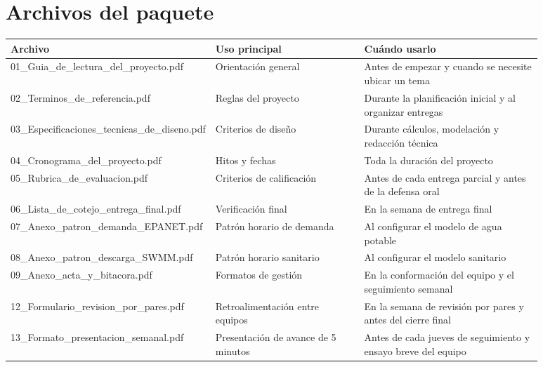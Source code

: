 \documentclass[11pt]{article}
\begin{document}
\section{Archivos del paquete}
\begin{center}
\begin{tabular}{p{0.18\linewidth} p{0.31\linewidth} p{0.39\linewidth}}
\toprule
\textbf{Archivo} & \textbf{Uso principal} & \textbf{Cu\'ando usarlo} \\
\midrule
01\_Guia\_de\_lectura\_del\_proyecto.pdf & Orientaci\'on general & Antes de empezar y cuando se necesite ubicar un tema \\
02\_Terminos\_de\_referencia.pdf & Reglas del proyecto & Durante la planificaci\'on inicial y al organizar entregas \\
03\_Especificaciones\_tecnicas\_de\_diseno.pdf & Criterios de dise\~no & Durante c\'alculos, modelaci\'on y redacci\'on t\'ecnica \\
04\_Cronograma\_del\_proyecto.pdf & Hitos y fechas & Toda la duraci\'on del proyecto \\
05\_Rubrica\_de\_evaluacion.pdf & Criterios de calificaci\'on & Antes de cada entrega parcial y antes de la defensa oral \\
06\_Lista\_de\_cotejo\_entrega\_final.pdf & Verificaci\'on final & En la semana de entrega final \\
07\_Anexo\_patron\_demanda\_EPANET.pdf & Patr\'on horario de demanda & Al configurar el modelo de agua potable \\
08\_Anexo\_patron\_descarga\_SWMM.pdf & Patr\'on horario sanitario & Al configurar el modelo sanitario \\
09\_Anexo\_acta\_y\_bitacora.pdf & Formatos de gesti\'on & En la conformaci\'on del equipo y el seguimiento semanal \\
12\_Formulario\_revision\_por\_pares.pdf & Retroalimentaci\'on entre equipos & En la semana de revisi\'on por pares y antes del cierre final \\
13\_Formato\_presentacion\_semanal.pdf & Presentaci\'on de avance de 5 minutos & Antes de cada jueves de seguimiento y ensayo breve del equipo \\
\bottomrule
\end{tabular}
\end{center}
\end{document}
